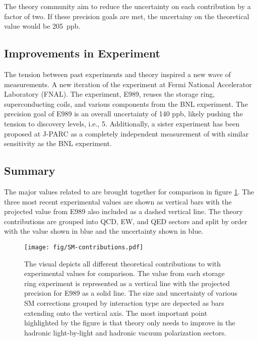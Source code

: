 The theory community aim to reduce the uncertainty on each contribution by a factor of two.  If these precision goals are met, the uncertainy on the theoretical value would be \SI{205}{ppb}.

\subsection{Improvements in Experiment}
The tension between past experiments and theory inspired a new wave of \mugmtwo measurements.  A new iteration of the \mugmtwo experiment at Fermi National Accelerator Laboratory (FNAL). The experiment, E989, reuses the storage ring, superconducting coils, and various components from the BNL experiment.  The precision goal of E989 is an overall uncertainty of 140 ppb, likely pushing the tension to discovery levels, i.e., \SI{5}{\sigma}. Additionally, a sister experiment has been proposed at J-PARC as a completely independent measurement of \mugmtwo with similar sensitivity as the BNL experiment.

\subsection{Summary}
The major values related to \mugmtwo are brought together for comparison in figure \ref{fig:sm-contributions}.  The three most recent experimental values are shown as vertical bars with the projected value from E989 also included as a dashed vertical line.  The theory contributions are grouped into QCD, EW, and QED sectors and split by order with the value shown in blue and the uncertainty shown in blue.

\begin{figure}
\label{fig:sm-contributions}
\centering
\texttt{[image: fig/SM-contributions.pdf]}
\caption{The visual depicts all different theoretical contributions to \mugmtwo with experimental values for comparison.  The value from each storage ring experiment is represented as a vertical line with the projected precision for E989 as a solid line.  The size and uncertainty of various SM corrections grouped by interaction type are depected as bars extending onto the vertical axis. The most important point highlighted by the figure is that theory only needs to improve in the hadronic light-by-light and hadronic vacuum polarization sectors.}
\end{figure}
